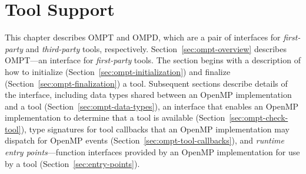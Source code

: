 \newcommand\codeptrdesc{
The argument \plc{codeptr_ra} is used to relate the implementation
of an OpenMP region back to its source code.  In cases where a runtime
routine implements the region associated with this callback,
\plc{codeptr_ra} is expected to contain the return address of the
call to the runtime routine.  In cases where the implementation of
this feature is inlined, \plc{codeptr_ra} is expected to contain the
return address of the invocation of this callback.  In cases where
attribution to source code is impossible or inappropriate,
\plc{codeptr_ra} may be \code{NULL}.
}


\chapter{Tool Support}
\label{chap:ToolsSupport}



This chapter describes OMPT and OMPD, which are a pair of interfaces for \emph{first-party} and \emph{third-party}
tools, respectively.  Section~\ref{sec:ompt-overview} describes OMPT---an interface for \emph{first-party} tools.
The section begins with a description of how to initialize (Section~\ref{sec:ompt-initialization})
and finalize (Section~\ref{sec:ompt-finalization}) a tool.
Subsequent sections describe details of the interface, including
data types shared between an OpenMP implementation and a tool
(Section~\ref{sec:ompt-data-types}),
an interface that enables an OpenMP implementation to determine that a
tool is available (Section~\ref{sec:ompt-check-tool}),
type signatures for tool callbacks
that an OpenMP implementation may dispatch for OpenMP events
(Section~\ref{sec:ompt-tool-callbacks}), and
\emph{runtime entry points}---function interfaces
provided by an OpenMP implementation for use by a tool
(Section~\ref{sec:entry-points}).

